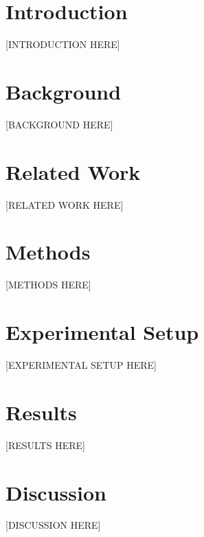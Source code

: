 \documentclass[11pt]{article}
\begin{document}
\section{Introduction}
[INTRODUCTION HERE]

\section{Background}
[BACKGROUND HERE]

\section{Related Work}
[RELATED WORK HERE]

\section{Methods}
[METHODS HERE]

\section{Experimental Setup}
[EXPERIMENTAL SETUP HERE]

\section{Results}
[RESULTS HERE]

\section{Discussion}
[DISCUSSION HERE]
\end{document}
